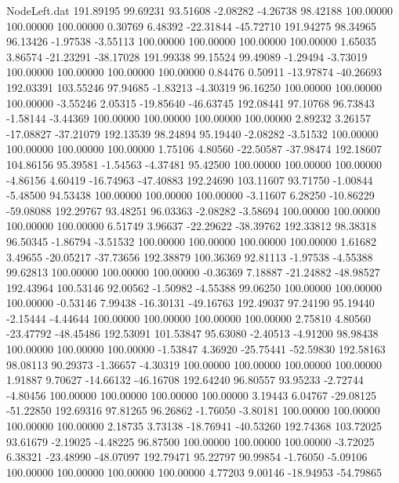 \begin{filecontents}{NodeLeft.dat}
 191.89195   99.69231   93.51608    -2.08282   -4.26738   98.42188  100.00000  100.00000  100.00000    0.30769    6.48392  -22.31844  -45.72710
 191.94275   98.34965   96.13426    -1.97538   -3.55113  100.00000  100.00000  100.00000  100.00000    1.65035    3.86574  -21.23291  -38.17028
 191.99338   99.15524   99.49089    -1.29494   -3.73019  100.00000  100.00000  100.00000  100.00000    0.84476    0.50911  -13.97874  -40.26693
 192.03391  103.55246   97.94685    -1.83213   -4.30319   96.16250  100.00000  100.00000  100.00000   -3.55246    2.05315  -19.85640  -46.63745
 192.08441   97.10768   96.73843    -1.58144   -3.44369  100.00000  100.00000  100.00000  100.00000    2.89232    3.26157  -17.08827  -37.21079
 192.13539   98.24894   95.19440    -2.08282   -3.51532  100.00000  100.00000  100.00000  100.00000    1.75106    4.80560  -22.50587  -37.98474
 192.18607  104.86156   95.39581    -1.54563   -4.37481   95.42500  100.00000  100.00000  100.00000   -4.86156    4.60419  -16.74963  -47.40883
 192.24690  103.11607   93.71750    -1.00844   -5.48500   94.53438  100.00000  100.00000  100.00000   -3.11607    6.28250  -10.86229  -59.08088
 192.29767   93.48251   96.03363    -2.08282   -3.58694  100.00000  100.00000  100.00000  100.00000    6.51749    3.96637  -22.29622  -38.39762
 192.33812   98.38318   96.50345    -1.86794   -3.51532  100.00000  100.00000  100.00000  100.00000    1.61682    3.49655  -20.05217  -37.73656
 192.38879  100.36369   92.81113    -1.97538   -4.55388   99.62813  100.00000  100.00000  100.00000   -0.36369    7.18887  -21.24882  -48.98527
 192.43964  100.53146   92.00562    -1.50982   -4.55388   99.06250  100.00000  100.00000  100.00000   -0.53146    7.99438  -16.30131  -49.16763
 192.49037   97.24190   95.19440    -2.15444   -4.44644  100.00000  100.00000  100.00000  100.00000    2.75810    4.80560  -23.47792  -48.45486
 192.53091  101.53847   95.63080    -2.40513   -4.91200   98.98438  100.00000  100.00000  100.00000   -1.53847    4.36920  -25.75441  -52.59830
 192.58163   98.08113   90.29373    -1.36657   -4.30319  100.00000  100.00000  100.00000  100.00000    1.91887    9.70627  -14.66132  -46.16708
 192.64240   96.80557   93.95233    -2.72744   -4.80456  100.00000  100.00000  100.00000  100.00000    3.19443    6.04767  -29.08125  -51.22850
 192.69316   97.81265   96.26862    -1.76050   -3.80181  100.00000  100.00000  100.00000  100.00000    2.18735    3.73138  -18.76941  -40.53260
 192.74368  103.72025   93.61679    -2.19025   -4.48225   96.87500  100.00000  100.00000  100.00000   -3.72025    6.38321  -23.48990  -48.07097
 192.79471   95.22797   90.99854    -1.76050   -5.09106  100.00000  100.00000  100.00000  100.00000    4.77203    9.00146  -18.94953  -54.79865

\end{filecontents}
